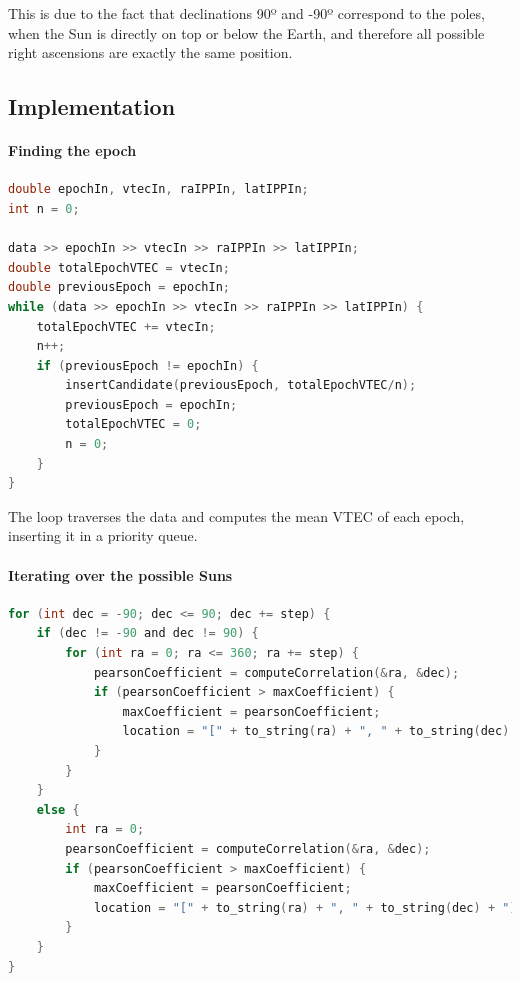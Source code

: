 This is due to the fact that declinations 90º and -90º correspond to the poles, when the Sun is directly on top or below the Earth, and therefore all possible right ascensions are exactly the same position.

\subsection{Implementation}

\paragraph{Finding the epoch}

\begin{minipage}{\linewidth}
\begin{lstlisting}[language=c, caption=Finding a VTEC spike]
double epochIn, vtecIn, raIPPIn, latIPPIn;
int n = 0;

data >> epochIn >> vtecIn >> raIPPIn >> latIPPIn;
double totalEpochVTEC = vtecIn;
double previousEpoch = epochIn;
while (data >> epochIn >> vtecIn >> raIPPIn >> latIPPIn) {
	totalEpochVTEC += vtecIn;
	n++;
	if (previousEpoch != epochIn) {
		insertCandidate(previousEpoch, totalEpochVTEC/n);
		previousEpoch = epochIn;
		totalEpochVTEC = 0;
		n = 0;
	}
}
\end{lstlisting}
\end{minipage}

The loop traverses the data and computes the mean VTEC of each epoch, inserting it in a priority queue.

\paragraph{Iterating over the possible Suns}
\begin{minipage}{\linewidth}
\begin{lstlisting}[language=c, caption=Main loops]
for (int dec = -90; dec <= 90; dec += step) {
	if (dec != -90 and dec != 90) {
		for (int ra = 0; ra <= 360; ra += step) {
			pearsonCoefficient = computeCorrelation(&ra, &dec);
			if (pearsonCoefficient > maxCoefficient) {
				maxCoefficient = pearsonCoefficient;
				location = "[" + to_string(ra) + ", " + to_string(dec) + "]";
			}
		}
	}
	else {
		int ra = 0;
		pearsonCoefficient = computeCorrelation(&ra, &dec);
		if (pearsonCoefficient > maxCoefficient) {
			maxCoefficient = pearsonCoefficient;
			location = "[" + to_string(ra) + ", " + to_string(dec) + "]";
		}
	}
}
\end{lstlisting}
\end{minipage}

